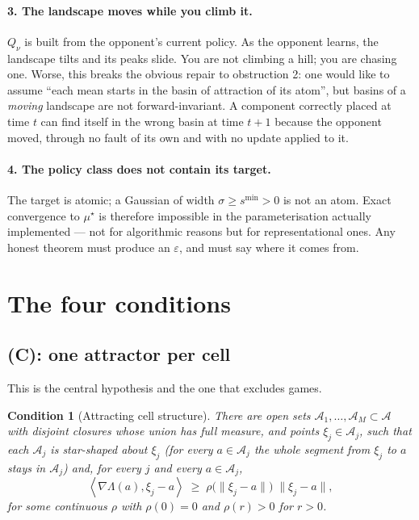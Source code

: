 \documentclass[11pt]{article}
\newtheorem{condition}{Condition}
\theoremstyle{definition}
\newcommand{\cA}{\mathcal{A}}
\newcommand{\ip}[2]{\left\langle #1, #2 \right\rangle}
\begin{document}
\paragraph{3. The landscape moves while you climb it.}
$Q_\nu$ is built from the opponent's current policy. As the opponent learns, the
landscape tilts and its peaks slide. You are not climbing a hill; you are chasing
one. Worse, this breaks the obvious repair to obstruction 2: one would like to
assume ``each mean starts in the basin of attraction of its atom'', but basins of
a \emph{moving} landscape are not forward-invariant. A component correctly placed
at time $t$ can find itself in the wrong basin at time $t+1$ because the opponent
moved, through no fault of its own and with no update applied to it.

\paragraph{4. The policy class does not contain its target.}
The target is atomic; a Gaussian of width $\sigma \ge s^{\min} > 0$ is not an
atom. Exact convergence to $\mu^\star$ is therefore impossible in the
parameterisation actually implemented --- not for algorithmic reasons but for
representational ones. Any honest theorem must produce an $\varepsilon$, and must
say where it comes from.

\section{The four conditions}\label{sec:conditions}

\subsection*{(C): one attractor per cell}

This is the central hypothesis and the one that excludes games.

\begin{condition}[Attracting cell structure]\label{cond:C}
There are open sets $\cA_1,\dots,\cA_{M} \subset \cA$ with disjoint closures
whose union has full measure, and points $\xi_j \in \cA_j$, such that each
$\cA_j$ is \emph{star-shaped about} $\xi_j$ (for every $a \in \cA_j$ the whole
segment from $\xi_j$ to $a$ stays in $\cA_j$) and, for every $j$ and every
$a \in \cA_j$,
\begin{equation}\label{eq:star}
  \ip{\nabla \Lambda(a)}{\xi_j - a}
  \;\ge\;
  \rho\big(\|\xi_j - a\|\big)\;\|\xi_j - a\| ,
\end{equation}
for some continuous $\rho$ with $\rho(0) = 0$ and $\rho(r) > 0$ for $r > 0$.
\end{condition}
\end{document}
